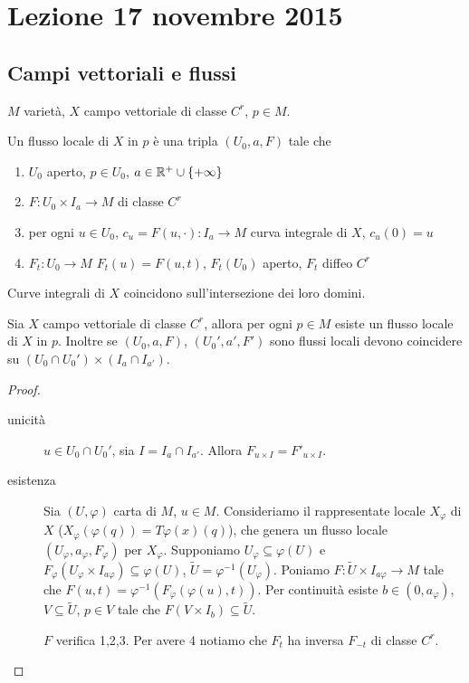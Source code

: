 \chapter{Lezione 17 novembre 2015}

\section{Campi vettoriali e flussi}


$M$ varietà, $X$ campo vettoriale di classe $C^r$, $p\in M$.
\begin{definition}
	Un flusso locale di $X$ in $p$ è una tripla $(U_0, a, F)$ tale che
	\begin{enumerate}
		\item $U_0$ aperto, $p\in U_0$, $a \in \mathbb R^+ \cup \{+\infty\}$
		\item $F:U_0\times I_a \to M$ di classe $C^r$
		\item per ogni $u\in U_0$, $c_u=F(u,\cdot):I_a\to M$ curva integrale di $X$, $c_u(0)=u$
		\item $F_t:U_0\to M$ $F_t(u)=F(u,t)$, $F_t(U_0)$ aperto, $F_t$ diffeo $C^r$
	\end{enumerate}
\end{definition}

\begin{proposition}
	Curve integrali di $X$ coincidono sull'intersezione dei loro domini.
\end{proposition}

\begin{proposition}
	Sia $X$ campo vettoriale di classe $C^r$, allora per ogni $p\in M$ esiste un flusso locale di $X$ in $p$. Inoltre se $(U_0,a,F)$, $(U_0',a',F')$ sono flussi locali devono coincidere su $(U_0\cap U_0')\times (I_a\cap I_{a'})$.
\end{proposition}
\begin{proof}
	\begin{description}
	\item [unicità]
	$u\in U_0\cap U_0'$, sia $I=I_a\cap I_{a'}$. Allora $F_{{u}\times I}=F'_{{u}\times I}$.
	
	\item [esistenza]
	Sia $(U,\varphi)$ carta di $M$, $u\in M$. Consideriamo il rappresentate locale $X_\varphi$ di $X$ ($X_\varphi(\varphi(q))=T\varphi(x)(q)$), che genera un flusso locale $(U_\varphi,a_\varphi,F_\varphi)$ per $X_\varphi$.
	Supponiamo $U_\varphi\subseteq \varphi(U)$ e $F_\varphi(U_\varphi\times I_{a\varphi})\subseteq \varphi(U)$, $\tilde U=\varphi^{-1}(U_\varphi)$.
	Poniamo $F:\tilde U\times I_{a\varphi}\to M$ tale che $F(u,t)=\varphi^{-1}(F_\varphi(\varphi(u),t))$.
	Per continuità esiste $b\in(0,a_\varphi)$, $V\subseteq \tilde U$, $p\in V$ tale che $F(V\times I_b)\subseteq \tilde U$.
	
	$F$ verifica 1,2,3. Per avere 4 notiamo che $F_t$ ha inversa $F_{-t}$ di classe $C^r$.
	\end{description}
\end{proof}

